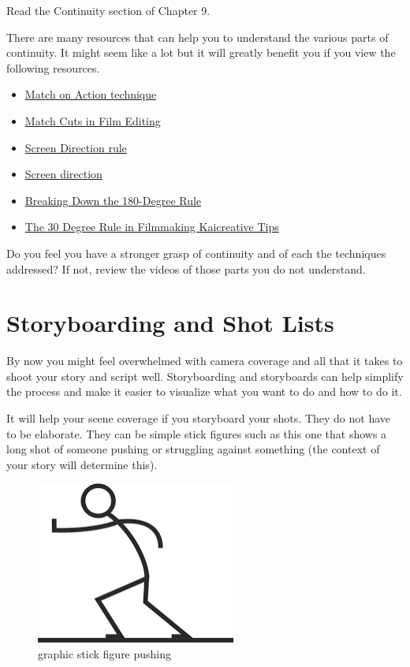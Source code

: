 \documentclass[
]{book}
\providecommand{\tightlist}{%
  \setlength{\itemsep}{0pt}\setlength{\parskip}{0pt}}
\begin{document}
\begin{reflect}
Read the Continuity section of Chapter 9.

There are many resources that can help you to understand the various parts of continuity. It might seem like a lot but it will greatly benefit you if you view the following resources.

\begin{itemize}
\tightlist
\item
  \href{https://www.youtube-nocookie.com/embed/eou7A-e2e4I}{Match on Action technique}
\item
  \href{https://www.youtube-nocookie.com/embed/El28XrjtcMI}{Match Cuts in Film Editing}
\item
  \href{https://www.youtube-nocookie.com/embed/9XOn5uxdSJc}{Screen Direction rule}
\item
  \href{https://www.youtube-nocookie.com/embed/RogoUz_pk4Y}{Screen direction}
\item
  \href{https://www.youtube-nocookie.com/embed/HinUychY3sE}{Breaking Down the 180-Degree Rule}
\item
  \href{https://www.youtube-nocookie.com/embed/1K8EUc98VoQ}{The 30 Degree Rule in Filmmaking \textbar{} Kaicreative \textbar{} Tips}
\end{itemize}

Do you feel you have a stronger grasp of continuity and of each the techniques addressed? If not, review the videos of those parts you do not understand.
\end{reflect}

\hypertarget{storyboarding-and-shot-lists}{%
\section{Storyboarding and Shot Lists}\label{storyboarding-and-shot-lists}}

By now you might feel overwhelmed with camera coverage and all that it takes to shoot your story and script well. Storyboarding and storyboards can help simplify the process and make it easier to visualize what you want to do and how to do it.

It will help your scene coverage if you storyboard your shots. They do not have to be elaborate. They can be simple stick figures such as this one that shows a long shot of someone pushing or struggling against something (the context of your story will determine this).

\begin{figure}
\centering
\includegraphics{assets/unit5/Picture1.png}
\caption{graphic stick figure pushing}
\end{figure}
\end{document}
